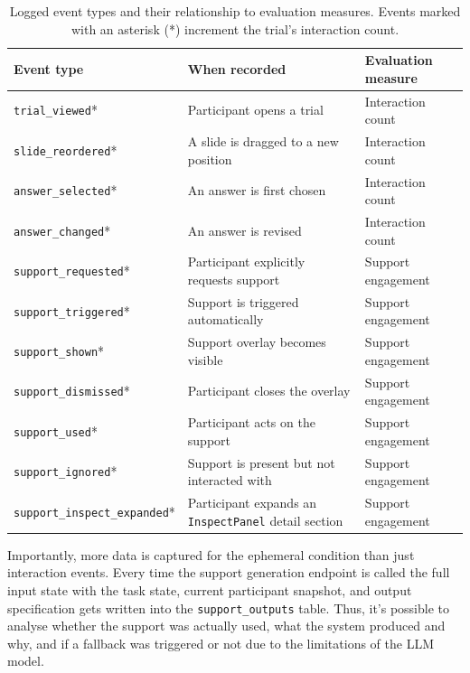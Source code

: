 \begin{table}[htbp]
    \centering
    \small
    \caption{Logged event types and their relationship to evaluation measures. Events marked with an asterisk (*) increment the trial's interaction count.}
    \label{tab:event-types}
    \begin{tabular}{@{}p{}p{}p{}@{}}
        \toprule
        Event type & When recorded & Evaluation measure \\
        \midrule
        \texttt{trial\_viewed}* & Participant opens a trial & Interaction count \\
        \texttt{slide\_reordered}* & A slide is dragged to a new position & Interaction count \\
        \texttt{answer\_selected}* & An answer is first chosen & Interaction count \\
        \texttt{answer\_changed}* & An answer is revised & Interaction count \\
        \midrule
        \texttt{support\_requested}* & Participant explicitly requests support & Support engagement \\
        \texttt{support\_triggered}* & Support is triggered automatically & Support engagement \\
        \texttt{support\_shown}* & Support overlay becomes visible & Support engagement \\
        \texttt{support\_dismissed}* & Participant closes the overlay & Support engagement \\
        \texttt{support\_used}* & Participant acts on the support & Support engagement \\
        \texttt{support\_ignored}* & Support is present but not interacted with & Support engagement \\
        \texttt{support\_inspect\_expanded}* & Participant expands an \texttt{InspectPanel} detail section & Support engagement \\
        \bottomrule
    \end{tabular}
\end{table}

Importantly, more data is captured for the ephemeral condition than just interaction events. Every time the support generation endpoint is called the full input state with the task state, current participant snapshot, and output specification gets written into the \texttt{support\_outputs} table. Thus, it's possible to analyse whether the support was actually used, what the system produced and why, and if a fallback was triggered or not due to the limitations of the LLM model.

